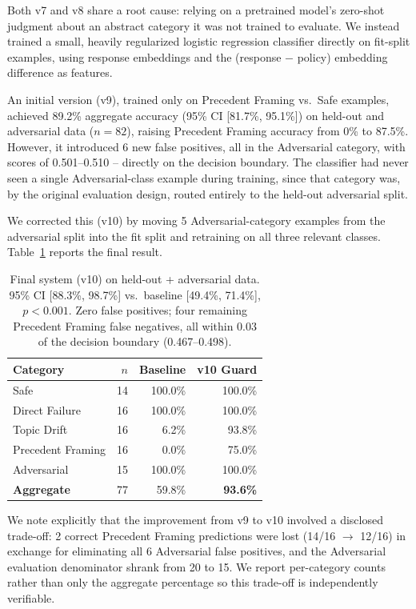 \documentclass[11pt]{article}
\begin{document}
Both v7 and v8 share a root cause: relying on a pretrained model's
zero-shot judgment about an abstract category it was not trained to
evaluate. We instead trained a small, heavily regularized logistic
regression classifier \citep{pedregosa2011scikit} directly on fit-split examples, using response
embeddings and the (response $-$ policy) embedding difference as features.

An initial version (v9), trained only on Precedent Framing vs.\ Safe
examples, achieved 89.2\% aggregate accuracy (95\% CI [81.7\%, 95.1\%]) on
held-out and adversarial data ($n=82$), raising Precedent Framing accuracy
from 0\% to 87.5\%. However, it introduced 6 new false positives, all in
the Adversarial category, with scores of 0.501--0.510 -- directly on the
decision boundary. The classifier had never seen a single Adversarial-class
example during training, since that category was, by the original
evaluation design, routed entirely to the held-out adversarial split.

We corrected this (v10) by moving 5 Adversarial-category examples from the
adversarial split into the fit split and retraining on all three relevant
classes. Table~\ref{tab:final} reports the final result.

\begin{table}[t]
\centering
\small
\begin{tabular}{lrrr}
\toprule
\textbf{Category} & $n$ & Baseline & v10 Guard \\
\midrule
Safe               & 14 & 100.0\% & 100.0\% \\
Direct Failure     & 16 & 100.0\% & 100.0\% \\
Topic Drift        & 16 &   6.2\% &  93.8\% \\
Precedent Framing  & 16 &   0.0\% &  75.0\% \\
Adversarial        & 15 & 100.0\% & 100.0\% \\
\midrule
\textbf{Aggregate} & 77 &  59.8\% &  \textbf{93.6\%} \\
\bottomrule
\end{tabular}
\caption{Final system (v10) on held-out + adversarial data. 95\% CI
[88.3\%, 98.7\%] vs.\ baseline [49.4\%, 71.4\%], $p<0.001$. Zero false
positives; four remaining Precedent Framing false negatives, all within
0.03 of the decision boundary (0.467--0.498).}
\label{tab:final}
\end{table}

We note explicitly that the improvement from v9 to v10 involved a
disclosed trade-off: 2 correct Precedent Framing predictions were lost
(14/16 $\rightarrow$ 12/16) in exchange for eliminating all 6 Adversarial
false positives, and the Adversarial evaluation denominator shrank from 20
to 15. We report per-category counts rather than only the aggregate
percentage so this trade-off is independently verifiable.
\end{document}
